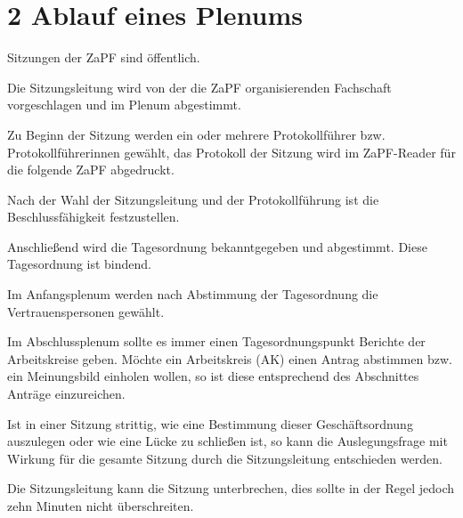 \documentclass[12pt,oneside]{scrartcl}
\begin{document}
\section{2 Ablauf eines Plenums%
  \label{ablauf-eines-plenums}%
}
\begin{list}{.}
{
\setlength{\rightmargin}{\leftmargin}
}

\item Sitzungen der ZaPF sind öffentlich.

\item Die Sitzungsleitung wird von der die ZaPF organisierenden Fachschaft
vorgeschlagen und im Plenum abgestimmt.

\item Zu Beginn der Sitzung werden ein oder mehrere Protokollführer bzw.
Protokollführerinnen gewählt, das Protokoll der Sitzung wird im
ZaPF-Reader für die folgende ZaPF abgedruckt.

\item Nach der Wahl der Sitzungsleitung und der Protokollführung ist die
Beschlussfähigkeit festzustellen.

\item Anschließend wird die Tagesordnung bekanntgegeben und abgestimmt.
Diese Tagesordnung ist bindend.

\item Im Anfangsplenum werden nach Abstimmung der Tagesordnung die
Vertrauenspersonen gewählt.
\end{list}
\setcounter{listcnt0}{0}
\begin{list}{.}
{
\addtocounter{listcnt0}{5}
\setlength{\rightmargin}{\leftmargin}
}

\item Im Abschlussplenum sollte es immer einen Tagesordnungspunkt \textquotedbl{}Berichte
der Arbeitskreise\textquotedbl{} geben.
Möchte ein Arbeitskreis (AK) einen Antrag abstimmen bzw. ein Meinungsbild
einholen wollen, so ist diese entsprechend des Abschnittes \textquotedbl{}Anträge\textquotedbl{}
einzureichen.

\item Ist in einer Sitzung strittig, wie eine Bestimmung dieser Geschäftsordnung
auszulegen oder wie eine Lücke zu schließen ist, so kann die Auslegungsfrage
mit Wirkung für die gesamte Sitzung durch die Sitzungsleitung entschieden
werden.

\item Die Sitzungsleitung kann die Sitzung unterbrechen, dies sollte in der
Regel jedoch zehn Minuten nicht überschreiten.
\end{list}
\end{document}
